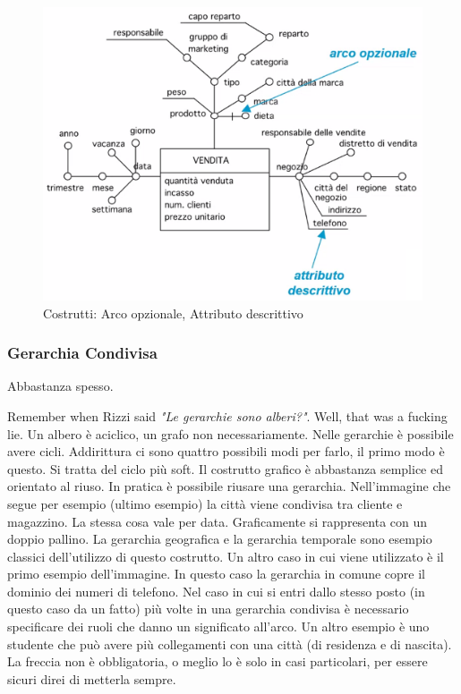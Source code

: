 \begin{figure}[H]
	\begin{center}
		\includegraphics[width=0.7\linewidth]{img/optdesc.png}
		\caption{Costrutti: Arco opzionale, Attributo descrittivo}
	\end{center}
\end{figure}

\subsubsection{Gerarchia Condivisa}
\begin{info}
	Abbastanza spesso.
\end{info}
Remember when Rizzi said \textit{"Le gerarchie sono alberi?"}. Well, that was a fucking lie.\newline
Un albero è aciclico, un grafo non necessariamente. Nelle gerarchie è possibile avere cicli. Addirittura ci sono quattro possibili modi per farlo, il primo modo è questo. Si tratta del ciclo più soft. Il costrutto grafico è abbastanza semplice ed orientato al riuso. In pratica è possibile riusare una gerarchia. Nell'immagine che segue per esempio (ultimo esempio) la città viene condivisa tra cliente e magazzino. La stessa cosa vale per data. Graficamente si rappresenta con un doppio pallino. La gerarchia geografica e la gerarchia temporale sono esempio classici dell'utilizzo di questo costrutto.\newline\newline
Un altro caso in cui viene utilizzato è il primo esempio dell'immagine. In questo caso la gerarchia in comune copre il dominio dei numeri di telefono. Nel caso in cui si entri dallo stesso posto (in questo caso da un fatto) più volte in una gerarchia condivisa è necessario specificare dei ruoli che danno un significato all'arco. Un altro esempio è uno studente che può avere più collegamenti con una città (di residenza e di nascita).\newline
La freccia non è obbligatoria, o meglio lo è solo in casi particolari, per essere sicuri direi di metterla sempre.\newline

